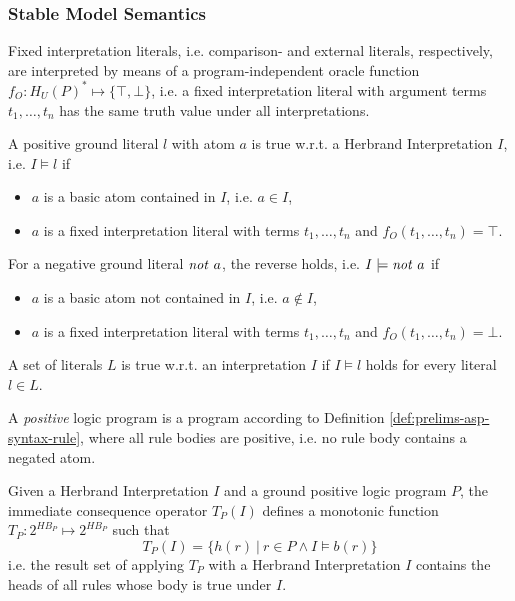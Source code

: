 \subsubsection{Stable Model Semantics}
\label{subsubsec:prelims-asp-semantics-stable-models}

\begin{definition}
Fixed interpretation literals, i.e. comparison- and external literals, respectively, are interpreted by means of a program-independent oracle function $f_O : H_{U}(P)^{*} \mapsto \{ \top, \bot \}$, i.e. a fixed interpretation literal with argument terms $t_1,\ldots,t_n$ has the same truth value under all interpretations.
\end{definition}

\begin{definition}
\label{def:prelims-asp-semantics-truth}
A positive ground literal $l$ with atom $a$ is true w.r.t. a Herbrand Interpretation $I$, i.e. $I \models l$ if
\begin{itemize}
	\item $a$ is a basic atom contained in $I$, i.e. $a \in I$,
	\item $a$ is a fixed interpretation literal with terms $t_1,\ldots,t_n$ and $f_O(t_1,\ldots,t_n) = \top$.
\end{itemize} 
For a negative ground literal $\NOT\ a$, the reverse holds, i.e. $I \models \mathit{not}\ a$ if
\begin{itemize}
	\item $a$ is a basic atom not contained in $I$, i.e. $a \notin I$,
	\item $a$ is a fixed interpretation literal with terms $t_1,\ldots,t_n$ and $f_O(t_1,\ldots,t_n) = \bot$.
\end{itemize} 
A set of literals $L$ is true w.r.t. an interpretation $I$ if $I \models l$ holds for every literal $l \in L$. 
\end{definition}

\begin{definition}
\label{def:prelims-asp-semantics-positive-program}
A \emph{positive} logic program is a program according to Definition \ref{def:prelims-asp-syntax-rule}, where all rule bodies are positive, i.e. no rule body contains a negated atom.
\end{definition}

\begin{definition}
\label{def:prelims-asp-semantics-immediate-consequence}
Given a Herbrand Interpretation $I$ and a ground positive logic program $P$, the immediate  consequence operator $T_P(I)$ defines a monotonic function $T_P: 2^{HB_P} \mapsto 2^{HB_P}$ such that
\[
	T_P(I) = \{h(r)\ |\ r \in P \land I \models b(r)\}
\]
i.e. the result set of applying $T_P$ with a Herbrand Interpretation $I$ contains the heads of all rules whose body is true under $I$.
\end{definition}

